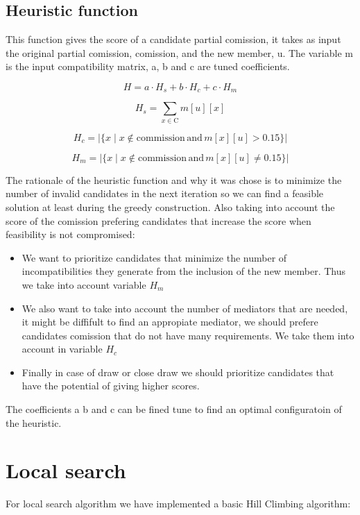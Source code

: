 \documentclass{article}
\begin{document}
\subsection{Heuristic function}
This function gives the score of a candidate partial comission, it takes as input the original partial comission, comission, and the new member, u.
The variable m is the input compatibility matrix, a, b and c are tuned coefficients.

\[
H = a \cdot H_s + b \cdot H_c + c \cdot H_m
\]

\[
H_s = \sum_{x \in \text{C}} m[u][x]
\]

\[
H_c = \left| \{ x \mid x \notin \text{commission} \, \text{and} \, m[x][u] > 0.15 \} \right|
\]

\[
H_m = \left| \{ x \mid x \notin \text{commission} \, \text{and} \, m[x][u] \neq 0.15 \} \right|
\]

The rationale of the heuristic function and why it was chose is to minimize the number of invalid candidates in the next iteration so we can find a feasible solution at least during the greedy construction. Also taking into account the score of the comission prefering candidates that increase the score when feasibility is not compromised:

\begin{itemize}
  \item We want to prioritize candidates that minimize the number of incompatibilities they generate from the inclusion of the new member. Thus we take into account variable $H_m$
  \item We also want to take into account the number of mediators that are needed, it might be diffifult to find an appropiate mediator, we should prefere candidates comission that do not have many requirements. We take them into account in variable $H_c$
  \item Finally in case of draw or close draw we should prioritize candidates that have the potential of giving higher scores.
\end{itemize}

The coefficients a b and c can be fined tune to find an optimal configuratoin of the heuristic.

\section{Local search}

For local search algorithm we have implemented a basic Hill Climbing algorithm: 
\end{document}
